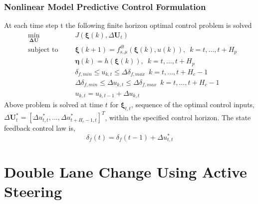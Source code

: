 \documentclass{beamer}
\begin{document}
\begin{frame}
	\frametitle{Nonlinear Model Predictive Control Formulation}
	At each time step t the following finite horizon
optimal control problem is solved
	\begin{equation}
	\label{Eq:Docking_Optimal_Control_Dicrete}
	\begin{alignedat}{2}
	&\underset{\boldsymbol{\Delta{U}}}{\text{min}}       &\;\;\;& {\textit{J}}(\boldsymbol{\xi}(k),\Delta\boldsymbol{U}_{t})\\
	&\text{subject to} &      & {\boldsymbol{\xi}}(k+1) = f^{dt}_{s,\mu}(\boldsymbol{\xi}(k),u(k)),\,\,\, k = t,\dots,t+H_{p} \\
	&      &      & \boldsymbol{\eta}(k) = h(\boldsymbol{\xi}(k)),\,\,\, k = t,\dots,t+H_{p} \\
	&      &      & \delta_{f,min} \leq u_{k,t} \leq \Delta\delta_{f,max} \,\,\, k = t,\dots,t+H_{c}-1\\ 
	&      &      & \Delta\delta_{f,min} \leq \Delta u_{k,t} \leq \Delta\delta_{f,max} \,\,\, k = t,\dots,t+H_{c}-1 \\
	&      &      & u_{k,t} = u_{k,t-1} + \Delta u_{k,t}
	\end{alignedat}
	\end{equation}
	Above problem is solved at time $t$ for $\bm{\xi}_{t,t}$, sequence of the optimal control inputs, $\Delta\bm{U}^{*}_{t}=[\Delta u^{*}_{t,t},\dots,\Delta u^{*}_{t+H_{c}-1,t}]^{T}$, within the specified control horizon. The state feedback control law is,
	\begin{equation}
	\label{eqn:control_law}
	\delta_{f}(t) = \delta_{f}(t-1) + \Delta{u}^{*}_{t,t}
	\end{equation} 
\end{frame}

\section{Double Lane Change Using Active Steering}
\end{document}
